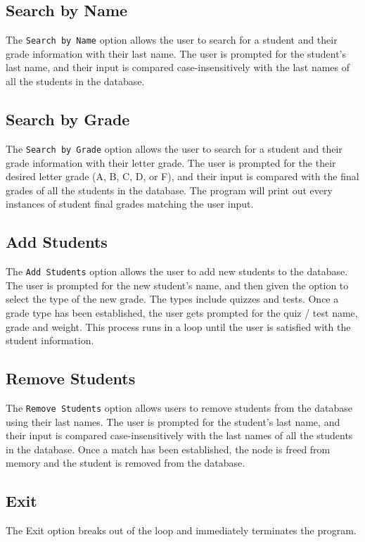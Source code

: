 \documentclass[usletter, 12pt]{article}
\begin{document}
        \subsection{Search by Name} The \texttt{Search by Name} option allows
        the user to search for a student and their grade information with their
        last name. The user is prompted for the student's last name, and their
        input is compared case-insensitively with the last names of all the
        students in the database.

        \subsection{Search by Grade} The \texttt{Search by Grade} option allows
        the user to search for a student and their grade information with their
        letter grade. The user is prompted for the their desired letter grade
        (A, B, C, D, or F), and their input is compared with the final grades
        of all the students in the database. The program will print out every
        instances of student final grades matching the user input.

        \subsection{Add Students} The \texttt{Add Students} option allows the
        user to add new students to the database. The user is prompted for the
        new student's name, and then given the option to select the type of the
        new grade. The types include quizzes and tests. Once a grade type has
        been established, the user gets prompted for the quiz / test name,
        grade and weight. This process runs in a loop until the user is
        satisfied with the student information.

        \subsection{Remove Students} The \texttt{Remove Students} option allows
        users to remove students from the database using their last names. The
        user is prompted for the student's last name, and their input is
        compared case-insensitively with the last names of all the students in
        the database. Once a match has been established, the node is freed from
        memory and the student is removed from the database.

        \subsection{Exit} The Exit option breaks out of the loop and
        immediately terminates the program.
\end{document}
